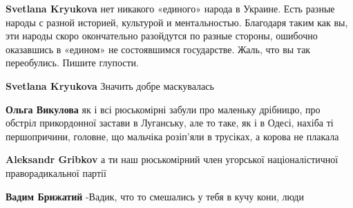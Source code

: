 \begin{itemize}
\begin{itemize}
 
\textbf{Svetlana Kryukova} нет никакого «единого» народа в Украине. Есть разные народы с разной историей, культурой и ментальностью. Благодаря таким как вы, эти народы скоро окончательно разойдутся по разные стороны, ошибочно оказавшись в «едином» не состоявшимся государстве. Жаль, что вы так переобулись. Пишите глупости.

 
\textbf{Svetlana Kryukova} Значить добре маскувалась🤣

 
\textbf{Ольга Викулова} як і всі рюськомірні забули про маленьку дрібницю, про обстріл прикордонної застави в Луганську, але то таке, як і в Одесі, нахіба ті першопричини, головне, що мальчіка розіп'яли в трусіках, а корова не плакала

 
\textbf{Aleksandr Gribkov} а ти наш рюськомірний член угорської націоналістичної праворадикальної партії

 
\textbf{Вадим Брижатий} -Вадик, что то смешались у тебя в кучу кони, люди\Laughey[1.0][white]

 

\end{itemize}
\end{itemize}
